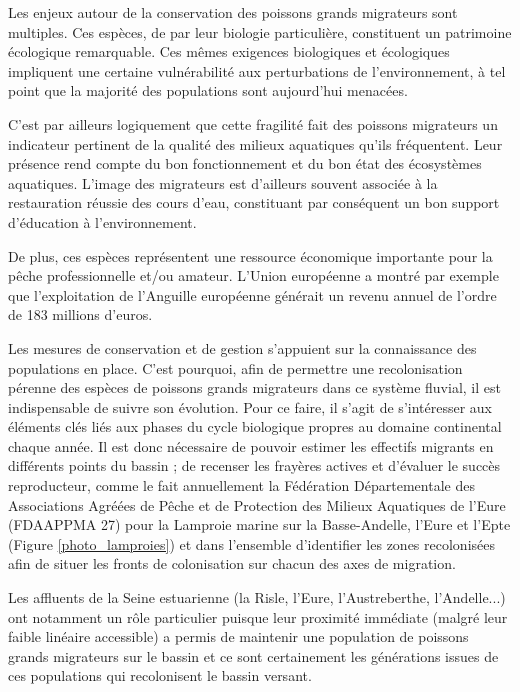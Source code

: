 \documentclass[11pt,twoside]{article}\usepackage[]{graphicx}\usepackage[table]{xcolor}
\begin{document}
Les enjeux autour de la conservation des poissons grands migrateurs sont multiples. Ces espèces, de par leur biologie particulière, constituent un patrimoine écologique remarquable. Ces mêmes exigences biologiques et écologiques impliquent une certaine vulnérabilité aux perturbations de l'environnement, à tel point que la majorité des populations sont aujourd'hui menacées.

C'est par ailleurs logiquement que cette fragilité fait des poissons migrateurs un indicateur pertinent de la qualité des milieux aquatiques qu'ils fréquentent. Leur présence rend compte du bon fonctionnement et du bon état des écosystèmes aquatiques. L'image des migrateurs est d'ailleurs souvent associée à la restauration \og réussie \fg{} des cours d'eau, constituant par conséquent un bon support d'éducation à l'environnement.

De plus, ces espèces représentent une ressource économique importante pour la pêche professionnelle et/ou amateur. L'Union européenne a montré par exemple que l'exploitation de l'Anguille européenne générait un revenu annuel de l'ordre de 183 millions d'euros.

Les mesures de conservation et de gestion s'appuient sur la connaissance des populations en place. C'est pourquoi, afin de permettre une recolonisation pérenne des espèces de poissons grands migrateurs dans ce système fluvial, il est indispensable de suivre son évolution. Pour ce faire, il s'agit de s'intéresser aux éléments clés liés aux phases du cycle biologique propres au domaine continental chaque année. Il est donc nécessaire de pouvoir estimer les effectifs migrants en différents points du bassin ; de recenser les frayères actives et d'évaluer le succès reproducteur, comme le fait annuellement la Fédération Départementale des Associations Agréées de Pêche et de Protection des Milieux Aquatiques de l'Eure (FDAAPPMA 27) pour la Lamproie marine sur la Basse-Andelle, l'Eure et l'Epte \citep{sanson_suivi_2009,sanson_suivi_2010,barault_suivi_2013,sanson_suivi_2013}(Figure \ref{photo_lamproies}) et dans l'ensemble d'identifier les zones recolonisées afin de situer les fronts de colonisation sur chacun des axes de migration.

Les affluents de la Seine estuarienne (la Risle, l'Eure, l'Austreberthe, l'Andelle...) ont notamment un rôle particulier puisque leur proximité immédiate (malgré leur faible linéaire accessible) a permis de maintenir une population de poissons grands migrateurs sur le bassin et ce sont certainement les générations issues de ces populations qui recolonisent le bassin versant.
\end{document}
